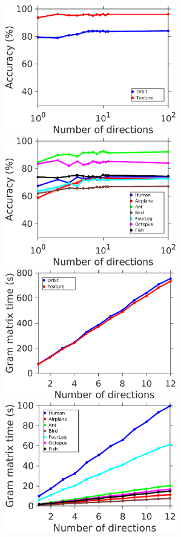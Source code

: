 \begin{figure}\centering
\includegraphics[width=7.5cm]{figures/accVSdir.pdf}\ \ \includegraphics[width=7.5cm]{figures/accVSdirprinceton.pdf} \\
\includegraphics[width=7.5cm]{figures/timeVSdir.pdf} \ \ \includegraphics[width=7.5cm]{figures/timeVSdirprinceton.pdf} \\

\end{figure}
